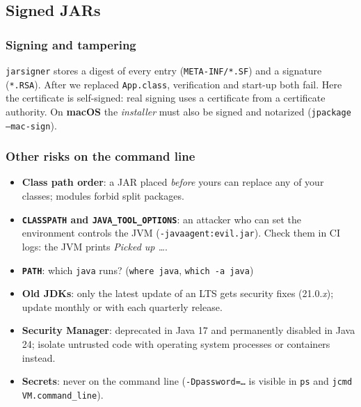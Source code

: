 \documentclass[aspectratio=169,10pt,compress]{beamer}
\newcommand{\mac}{\textbf{macOS}}
\begin{document}
\subsection[Signing]{Signed JARs}




\begin{frame}[t,fragile] \frametitle{Signing and tampering}

  \vspace{0.1em}
  \small
  \texttt{jarsigner} stores a digest of every entry (\texttt{META-INF/*.SF}) and a signature (\texttt{*.RSA}).
  After we replaced \texttt{App.class}, verification and start-up both fail. Here the certificate is self-signed: real signing uses a
  certificate from a certificate authority. On \mac{} the \emph{installer} must also be signed and notarized (\texttt{jpackage --mac-sign}).
\end{frame}




\begin{frame}[t,fragile] \frametitle{Other risks on the command line}
  \begin{itemize}\small
    \item \textbf{Class path order}: a JAR placed \emph{before} yours can replace any of your classes; modules forbid split packages.
    \item \textbf{\texttt{CLASSPATH} and \texttt{JAVA\_TOOL\_OPTIONS}}: an attacker who can set the environment controls the JVM
      (\texttt{-javaagent:evil.jar}). Check them in CI logs: the JVM prints \emph{Picked up \dots}.
    \item \textbf{\texttt{PATH}}: which \texttt{java} runs? (\texttt{where java}, \texttt{which -a java})
    \item \textbf{Old JDKs}: only the latest update of an LTS gets security fixes (21.0.\emph{x}); update monthly or with each quarterly release.
    \item \textbf{Security Manager}: deprecated in Java 17 and permanently disabled in Java 24; isolate untrusted code with
      operating system processes or containers instead.
    \item \textbf{Secrets}: never on the command line (\texttt{-Dpassword=\dots} is visible in \texttt{ps} and \texttt{jcmd VM.command\_line}).
  \end{itemize}
\end{frame}
\end{document}
